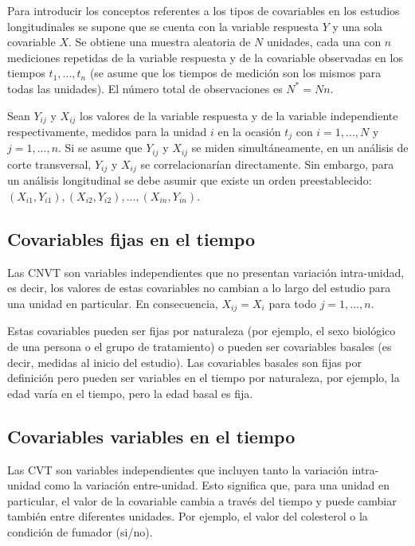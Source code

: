\documentclass[spanish]{article}
\numberwithin{figure}{subsection}
\numberwithin{equation}{subsection}
\numberwithin{table}{subsection}
\begin{document}
Para introducir los conceptos referentes a los tipos de covariables en los
estudios longitudinales se supone que se cuenta con la variable respuesta $Y$ y
una sola covariable $X$. Se obtiene una muestra aleatoria de $N$ unidades, cada
una con $n$ mediciones repetidas de la variable respuesta y de la covariable
observadas en los tiempos $t_1, ..., t_n$ (se asume que los tiempos de medición
son los mismos para todas las unidades). El número total de observaciones es
$N^*=Nn$.

Sean $Y_{ij}$ y $X_{ij}$ los valores de la variable respuesta y de la variable
independiente respectivamente, medidos para la unidad $i$ en la ocasión $t_j$
con $i = 1, ..., N$ y $j = 1, ..., n$. Si se asume que $Y_{ij}$ y $X_{ij}$ se
miden simultáneamente, en un análisis de corte transversal, $Y_{ij}$ y $X_{ij}$
se correlacionarían directamente. Sin embargo, para un análisis longitudinal se
debe asumir que existe un orden preestablecido: $(X_{i1}, Y_{i1}), (X_{i2},
Y_{i2}), ..., (X_{in}, Y_{in})$.

\subsection{Covariables fijas en el tiempo}

Las CNVT son variables independientes que no presentan variación intra-unidad,
es decir, los valores de estas covariables no cambian a lo largo del estudio
para una unidad en particular. En consecuencia, $X_{ij} = X_i$ para todo
$j = 1, ..., n$.

Estas covariables pueden ser fijas por naturaleza (por ejemplo, el sexo
biológico de una persona o el grupo de tratamiento) o pueden ser covariables
basales (es decir, medidas al inicio del estudio). Las covariables basales son
fijas por definición pero pueden ser variables en el tiempo por naturaleza, por
ejemplo, la edad varía en el tiempo, pero la edad basal es fija.

\subsection{Covariables variables en el tiempo}

Las CVT son variables independientes que incluyen tanto la variación
intra-unidad como la variación entre-unidad. Esto significa que, para una unidad
en particular, el valor de la covariable cambia a través del tiempo y puede
cambiar también entre diferentes unidades. Por ejemplo, el valor del colesterol
o la condición de fumador (si/no).
\end{document}

